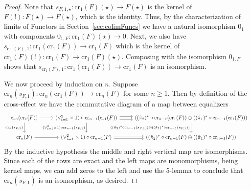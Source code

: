 \begin{proof}
    Note that $s_{F,1,\star}:\text{cr}_1(F)(\star)\to F(\star)$ is the kernel of $F(!):F(\star)\to F(\star)$, which is the identity. Thus, by the characterization of limits of Functors in Section~\ref{sec:colimFuncs} we have a natural isomorphism $0_1$ with components $0_{1,F}:\text{cr}_1(F)(\star)\to 0$. Next, we also have $s_{\text{cr}_1(F),1}:\text{cr}_1(\text{cr}_1(F))\to \text{cr}_1(F)$ which is the kernel of $\text{cr}_1(F)(!):\text{cr}_1(F)\to \text{cr}_1(F)(\star)$. Composing with the isomorphism $0_{1,F}$ shows that $s_{\text{cr}_1(F),1}:\text{cr}_1(\text{cr}_1(F))\to \text{cr}_1(F)$ is an isomorphism.
    

    \vspace{10pt}

    We now proceed by induction on $n$. Suppose $\text{cr}_n(s_{F,1}):\text{cr}_n(\text{cr}_1(F))\to \text{cr}_n(F)$ for some $n \geq 1$. Then by definition of the cross-effect we have the commutative diagram of a map between equalizers
    \[\begin{tikzcd}
        {\text{cr}_n(\text{cr}_1(F))} & {(\lor_{i=1}^2\times 1)\circ \text{cr}_{n-1}(\text{cr}_1(F))} & {((\hat{\pi}_2)^*\circ \text{cr}_{n-1}(\text{cr}_1(F))\oplus ((\hat{\pi}_1)^*\circ \text{cr}_{n-1}(\text{cr}_1(F)))} \\
        {\text{cr}_n(F)} & {(\lor_{i=1}^2\times 1)\circ \text{cr}_{n-1}(F)} & {((\hat{\pi}_2)^*\circ \text{cr}_{n-1}(F)\oplus ((\hat{\pi}_1)^*\circ \text{cr}_{n-1}(F))}
        \arrow["{\text{cr}_n(s_{F,1})}"', from=1-1, to=2-1]
        \arrow[from=1-1, to=1-2]
        \arrow[shift left, from=1-2, to=1-3]
        \arrow[from=2-1, to=2-2]
        \arrow[shift left, from=2-2, to=2-3]
        \arrow[shift right, from=2-2, to=2-3]
        \arrow[shift right, from=1-2, to=1-3]
        \arrow["{(\lor_{i=1}^2\times 1)\circ \text{cr}_{n-1}(s_{F,1})}"', from=1-2, to=2-2]
        \arrow["{((\hat{\pi}_2)^*\circ \text{cr}_{n-1}(s_{F,1}))\oplus ((\hat{\pi}_1)^*\circ \text{cr}_{n-1}(s_{F,1}))}"', from=1-3, to=2-3]
    \end{tikzcd}\]
    By the inductive hypothesis the middle and right vertical map are isomorphisms. Since each of the rows are exact and the left maps are monomorphisms, being kernel maps, we can add zeros to the left and use the 5-lemma to conclude that $\text{cr}_n(s_{F,1})$ is an isomorphism, as desired.

\end{proof}

